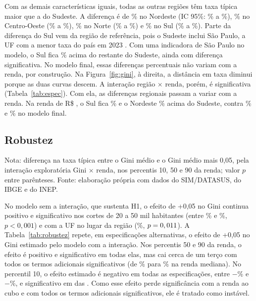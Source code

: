 \documentclass[a4paper,11pt]{article}
\newcommand{\fonte}{Fonte: elaboração própria com dados do SIM/DATASUS, do IBGE e do INEP.}
\newcommand{\nota}[2][\fonte]{\par\vspace{2pt}\begin{minipage}{\linewidth}\footnotesize Nota: #2 #1\end{minipage}}
\begin{document}
Com as demais características iguais, todas as outras regiões têm taxa típica maior que a do Sudeste. A diferença é de \nEfNordeste\% no Nordeste (IC 95\%: \nIcInfNordeste\% a \nIcSupNordeste\%), \nEfCentroOeste\% no Centro-Oeste (\nIcInfCentroOeste\% a \nIcSupCentroOeste\%), \nEfNorte\% no Norte (\nIcInfNorte\% a \nIcSupNorte\%) e \nEfSul\% no Sul (\nIcInfSul\% a \nIcSupSul\%). Parte da diferença do Sul vem da região de referência, pois o Sudeste inclui São Paulo, a UF com a menor taxa do país em 2023 \citep{cerqueira2025}. Com uma indicadora de São Paulo no modelo, o Sul fica \nEfSulSemSP\% acima do restante do Sudeste, ainda com diferença significativa. No modelo final, essas diferenças percentuais não variam com a renda, por construção. Na Figura~\ref{fig:gini}, à direita, a distância em taxa diminui porque as duas curvas descem. A interação região $\times$ renda, porém, é significativa (Tabela~\ref{tab:espec}). Com ela, as diferenças regionais passam a variar com a renda. Na renda de R\$ \nCentroRenda, o Sul fica \nEfSulRR\% e o Nordeste \nEfNordesteRR\% acima do Sudeste, contra \nEfSul\% e \nEfNordeste\% no modelo final.

\subsection{Robustez}
\label{sec:robustez}

\begin{table}[!htb]
\centering
\caption{Efeito do Gini em especificações alternativas}
\label{tab:robustez}
\small
\setlength{\tabcolsep}{4pt}
%
\nota{diferença na taxa típica entre o Gini médio e o Gini médio mais 0,05, pela interação exploratória Gini $\times$ renda, nos percentis 10, 50 e 90 da renda; valor $p$ entre parênteses.}
\end{table}

No modelo sem a interação, que sustenta H1, o efeito de +0,05 no Gini continua positivo e significativo nos cortes de 20 a 50 mil habitantes (entre \nGiniDCorteMin\% e \nGiniDCorteMax\%, $p < 0{,}001$) e com a UF no lugar da região (\nGiniEfDUF\%, $p = 0,011$). A Tabela~\ref{tab:robustez} repete, em especificações alternativas, o efeito de +0,05 no Gini estimado pelo modelo com a interação. Nos percentis 50 e 90 da renda, o efeito é positivo e significativo em todas elas, mas cai cerca de um terço com todos os termos adicionais significativos (de \nGiniEfMediana\% para \nTodosMed\% na renda mediana). No percentil 10, o efeito estimado é negativo em todas as especificações, entre $-$\nPDezMin\% e $-$\nPDezMax\%, e significativo em \nPDezSig{} das \nNEspec. Como esse efeito perde significância com a renda ao cubo e com todos os termos adicionais significativos, ele é tratado como instável.
\end{document}

